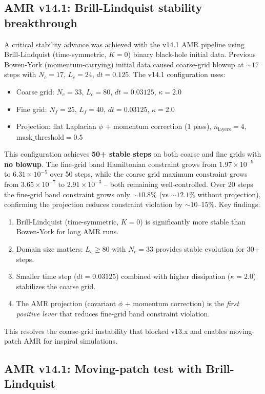 \subsection{AMR v14.1: Brill-Lindquist stability breakthrough}

A critical stability advance was achieved with the v14.1 AMR pipeline using Brill-Lindquist (time-symmetric, $K=0$) binary black-hole initial data. Previous Bowen-York (momentum-carrying) initial data caused coarse-grid blowup at $\sim 17$ steps with $N_c=17$, $L_c=24$, $dt=0.125$. The v14.1 configuration uses:
\begin{itemize}
    \item Coarse grid: $N_c=33$, $L_c=80$, $dt=0.03125$, $\kappa=2.0$
    \item Fine grid: $N_f=25$, $L_f=40$, $dt=0.03125$, $\kappa=2.0$
    \item Projection: flat Laplacian $\phi$ + momentum correction (1 pass), $n_{\text{layers}}=4$, $\text{mask\_threshold}=0.5$
\end{itemize}
This configuration achieves \textbf{50+ stable steps} on both coarse and fine grids with \textbf{no blowup}. The fine-grid band Hamiltonian constraint grows from $1.97\times 10^{-9}$ to $6.31\times 10^{-5}$ over 50 steps, while the coarse grid maximum constraint grows from $3.65\times 10^{-7}$ to $2.91\times 10^{-3}$ -- both remaining well-controlled. Over 20 steps the fine-grid band constraint grows only $\sim 10.8\%$ (vs $\sim 12.1\%$ without projection), confirming the projection reduces constraint violation by $\sim 10\text{--}15\%$. Key findings:
\begin{enumerate}
    \item Brill-Lindquist (time-symmetric, $K=0$) is significantly more stable than Bowen-York for long AMR runs.
    \item Domain size matters: $L_c \ge 80$ with $N_c=33$ provides stable evolution for 30+ steps.
    \item Smaller time step ($dt=0.03125$) combined with higher dissipation ($\kappa=2.0$) stabilizes the coarse grid.
    \item The AMR projection (covariant $\phi$ + momentum correction) is the \emph{first positive lever} that reduces fine-grid band constraint violation.
\end{enumerate}
This resolves the coarse-grid instability that blocked v13.x and enables moving-patch AMR for inspiral simulations.

\subsection{AMR v14.1: Moving-patch test with Brill-Lindquist}
\label{sec:amr-moving-patch}

